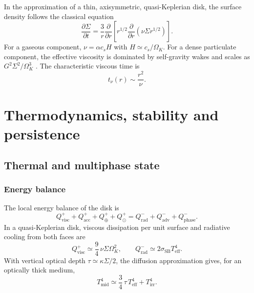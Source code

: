 \documentclass[11pt,a4paper,openany]{report}
\begin{document}
In the approximation of a thin, axisymmetric, quasi-Keplerian disk, the surface density follows the
classical equation \cite{Pringle1981}
\begin{equation}
\frac{\partial\Sigma}{\partial t}=\frac{3}{r}\frac{\partial}{\partial r}
\left[r^{1/2}\frac{\partial}{\partial r}\left(\nu\Sigma r^{1/2}\right)\right].
\label{eq:visc}
\end{equation}
For a gaseous component, $\nu=\alpha c_sH$ with $H\simeq c_s/\Omega_K$. For a dense particulate
component, the effective viscosity is dominated by self-gravity wakes and scales as
$G^2\Sigma^2/\Omega_K^3$ \cite{Daisaka2001}. The characteristic viscous time is
\begin{equation}
t_\nu(r)\sim\frac{r^2}{\nu}.
\label{eq:tnu}
\end{equation}

\chapter{Thermodynamics, stability and persistence}
\label{ch:thermo}

\section{Thermal and multiphase state}
\subsection{Energy balance}

The local energy balance of the disk is
\begin{equation}
Q^{+}_{\mathrm{visc}}+Q^{+}_{\mathrm{acc}}+Q^{+}_{\oplus}+Q^{+}_{\odot}
=Q^{-}_{\mathrm{rad}}+Q^{-}_{\mathrm{adv}}+Q^{-}_{\mathrm{phase}}.
\label{eq:bilanE}
\end{equation}
In a quasi-Keplerian disk, viscous dissipation per unit surface and radiative cooling from both
faces are
\begin{equation}
Q^{+}_{\mathrm{visc}}\simeq\frac94\,\nu\Sigma\Omega_K^2,
\qquad
Q^{-}_{\mathrm{rad}}\simeq2\sigma_{\mathrm{SB}}T_{\mathrm{eff}}^4.
\label{eq:Qvisc}
\end{equation}
With vertical optical depth $\tau\simeq\kappa\Sigma/2$, the diffusion approximation gives, for an
optically thick medium,
\begin{equation}
T_{\mathrm{mid}}^4\simeq\frac34\,\tau\,T_{\mathrm{eff}}^4+T_{\mathrm{irr}}^4.
\label{eq:Tmid}
\end{equation}
\end{document}
